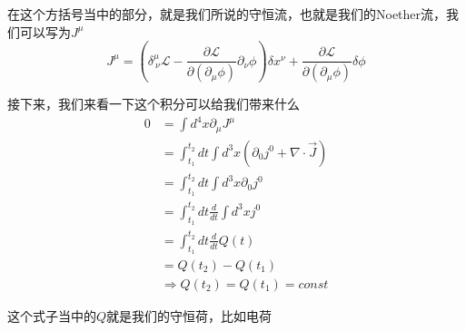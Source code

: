 在这个方括号当中的部分，就是我们所说的守恒流，也就是我们的Noether流，我们可以写为$J^\mu$
\begin{equation*}
    J^\mu=\left(\delta^\mu_{\ \nu}\mathcal{L}-\frac{\partial\mathcal{L}}{\partial(\partial_\mu\phi)}\partial_\nu\phi\right)\delta x^\nu+\frac{\partial\mathcal{L}}{\partial(\partial_\mu\phi)}\delta\phi
\end{equation*}

接下来，我们来看一下这个积分可以给我们带来什么
\begin{align*}
    0&=\int d^4x\partial_\mu J^\mu\\
    &=\int_{t_1}^{t_2}dt\int d^3x\left(\partial_0j^0+\nabla\cdot\vec{J}\right)\\
    &=\int_{t_1}^{t_2}dt\int d^3x\partial_0j^0\\
    &=\int_{t_1}^{t_2}dt \frac{d}{dt}\int d^3x j^0\\
    &=\int_{t_1}^{t_2}dt \frac{d}{dt}Q(t)\\
    &=Q(t_2)-Q(t_1)\\
    &\Rightarrow Q(t_2)=Q(t_1)=const
\end{align*}

这个式子当中的$Q$就是我们的守恒荷，比如电荷

